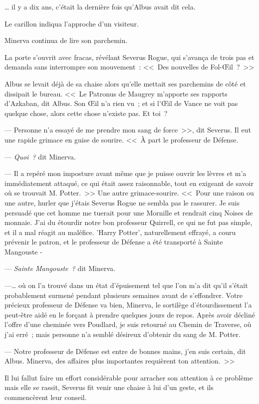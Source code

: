 … il y a dix ans, c'était la dernière fois qu'Albus avait dit cela.

Le carillon indiqua l'approche d'un visiteur.

Minerva continua de lire son parchemin.

La porte s'ouvrit avec fracas, révélant Severus Rogue, qui s'avança de trois pas et demanda sans interrompre son mouvement~: <<~Des nouvelles de Fol-Œil~?~>>

Albus se levait déjà de sa chaise alors qu'elle mettait ses parchemins de côté et dissipait le bureau. <<~Le Patronus de Maugrey m'apporte ses rapports d'Azkaban, dit Albus. Son Œil n'a rien vu~; et si l'Œil de Vance ne voit pas quelque chose, alors cette chose n'existe pas. Et toi~?

--- Personne n'a essayé de me prendre mon sang de force~>>, dit Severus. Il eut une rapide grimace en guise de sourire. <<~À part le professeur de Défense.

--- \emph{Quoi~?} dit Minerva.

--- Il a repéré mon imposture avant même que je puisse ouvrir les lèvres et m'a immédiatement attaqué, ce qui était assez raisonnable, tout en exigeant de savoir où se trouvait M. Potter.~>> Une autre grimace-sourire. <<~Pour une raison ou une autre, hurler que j'étais Severus Rogue ne sembla pas le rassurer. Je suis persuadé que cet homme me tuerait pour une Mornille et rendrait cinq Noises de monnaie. J'ai du étourdir notre bon professeur Quirrell, ce qui ne fut pas simple, et il a mal réagit au maléfice. 'Harry Potter', naturellement effrayé, a couru prévenir le patron, et le professeur de Défense a été transporté à Sainte Mangouste -

--- \emph{Sainte Mangouste~?} dit Minerva.

---… où on l'a trouvé dans un état d'épuisement tel que l'on m'a dit qu'il s'était probablement surmené pendant plusieurs semaines avant de s'effondrer. Votre précieux professeur de Défense va bien, Minerva, le sortilège d'étourdissement l'a peut-être aidé en le forçant à prendre quelques jours de repos. Après avoir décliné l'offre d'une cheminée vers Poudlard, je suis retourné au Chemin de Traverse, où j'ai erré~; mais personne n'a semblé désireux d'obtenir du sang de M. Potter.

--- Notre professeur de Défense est entre de bonnes mains, j'en suis certain, dit Albus. Minerva, des affaires plus importantes requièrent ton attention.~>>

Il lui fallut faire un effort considérable pour arracher son attention à ce problème mais elle se rassit, Severus fit venir une chaise à lui d'un geste, et ils commencèrent leur conseil.

